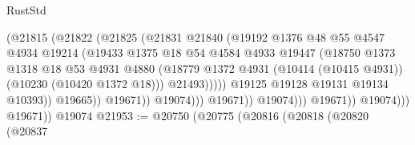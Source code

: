 \begin{lexlean}{RustStd}
\begin{coremodule}
                                          (@21815
                                            (@21822
                                              (@21825
                                                (@21831
                                                  @21840
                                                  (@19192
                                                    @1376
                                                    @48
                                                    @55
                                                    @4547
                                                    @4934
                                                    @19214
                                                    (@19433
                                                      @1375
                                                      @18
                                                      @54
                                                      @4584
                                                      @4933
                                                      @19447
                                                      (@18750
                                                        @1373
                                                        @1318
                                                        @18
                                                        @53
                                                        @4931
                                                        @4880
                                                        (@18779
                                                          @1372
                                                          @4931
                                                          (@10414 (@10415 @4931))
                                                          (@10230 (@10420 @1372 @18)))
                                                        @21493)))))
                                              @19125
                                              @19128
                                              @19131
                                              @19134
                                              @10393))
                                          @19665))
                                      @19671))
                                  @19074)))
                            @19671))
                        @19074)))
                  @19671))
              @19074)))
        @19671))
    @19074
@21953 := @20750
    (@20775
      (@20816
        (@20818
          (@20820
            (@20837

\end{coremodule}
\end{lexlean}
